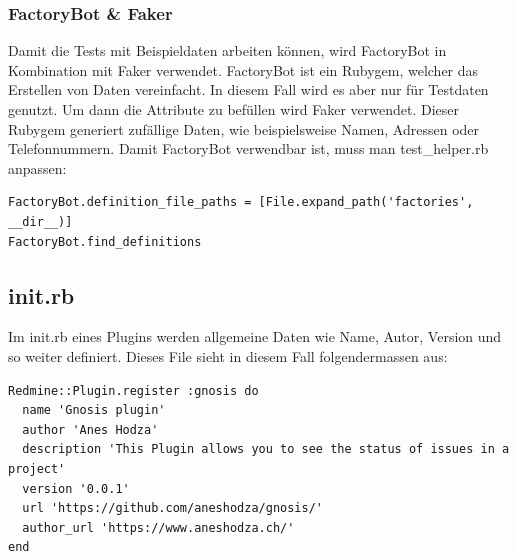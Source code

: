 \subsubsection{FactoryBot \& Faker}
Damit die Tests mit Beispieldaten arbeiten können, wird FactoryBot in Kombination mit Faker verwendet. FactoryBot ist ein
Rubygem, welcher das Erstellen von Daten vereinfacht. In diesem Fall wird es aber nur für Testdaten genutzt. Um dann die
Attribute zu befüllen wird Faker verwendet. Dieser Rubygem generiert zufällige Daten, wie beispielsweise Namen, Adressen
oder Telefonnummern. \newline
Damit FactoryBot verwendbar ist, muss man test\_helper.rb anpassen:
\begin{codebox}[]
  \begin{verbatim}
FactoryBot.definition_file_paths = [File.expand_path('factories', __dir__)]
FactoryBot.find_definitions
  \end{verbatim}
\end{codebox}

\subsection{init.rb}
Im init.rb eines Plugins werden allgemeine Daten wie Name, Autor, Version und so weiter definiert. Dieses File sieht
in diesem Fall folgendermassen aus:
\begin{codebox}[]
  \begin{verbatim}
Redmine::Plugin.register :gnosis do
  name 'Gnosis plugin'
  author 'Anes Hodza'
  description 'This Plugin allows you to see the status of issues in a project'
  version '0.0.1'
  url 'https://github.com/aneshodza/gnosis/'
  author_url 'https://www.aneshodza.ch/'
end
  \end{verbatim}
\end{codebox}

